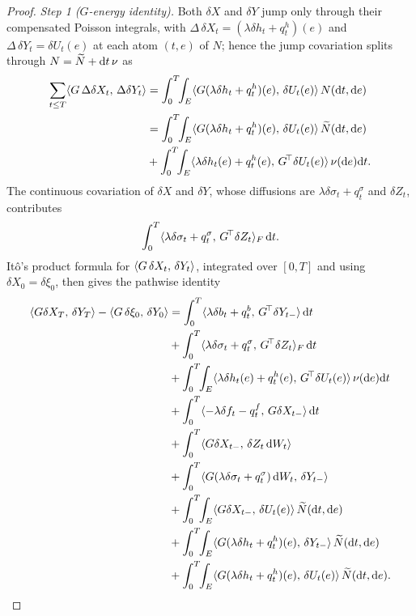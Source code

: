 \begin{proof}
\emph{Step 1 ($G$-energy identity).} Both $\delta X$ and $\delta Y$ jump only through
their compensated Poisson integrals, with $\Delta\,\delta X_t=(\lambda\delta h_t+q^h_t)(e)$
and $\Delta\,\delta Y_t=\delta U_t(e)$ at each atom $(t,e)$ of $N$; hence the jump
covariation splits through $N=\widetilde{N}+\mathrm{d} t\,\nu$ as
\[
\begin{aligned}
\sum_{t\le T}\langle G\,\Delta\delta X_t,\,\Delta\delta Y_t\rangle
&=\int_0^T\!\!\int_E\langle G(\lambda\delta h_t+q^h_t)(e),\,\delta U_t(e)\rangle\,N(\mathrm{d} t,\mathrm{d} e)\\
&=\int_0^T\!\!\int_E\langle G(\lambda\delta h_t+q^h_t)(e),\,\delta U_t(e)\rangle\,\widetilde{N}(\mathrm{d} t,\mathrm{d} e)\\
&+\int_0^T\!\!\int_E\langle \lambda\delta h_t(e)+q^h_t(e),\,G^{\!\top}\delta U_t(e)\rangle\,\nu(\mathrm{d} e)\mathrm{d} t .
\end{aligned}
\]
The continuous covariation of $\delta X$ and $\delta Y$, whose diffusions are
$\lambda\delta\sigma_t+q^\sigma_t$ and $\delta Z_t$, contributes
\[
\int_0^T\langle \lambda\delta\sigma_t+q^\sigma_t,\,G^{\!\top}\delta Z_t\rangle_F\,\mathrm{d} t .
\]
It\^o's product formula for $\langle G\,\delta X_t,\,\delta Y_t\rangle$, integrated over $[0,T]$ and using
$\delta X_0=\delta\xi_0$, then gives the pathwise identity
\begin{equation}\label{eq:Gid-path}
\begin{aligned}
\inner{G\delta X_T}{\delta Y_T}-\inner{G\,\delta\xi_0}{\delta Y_0}
&=\int_0^T\inner{\lambda\delta b_t+q^b_t}{\Gstar\delta Y_{t-}}\,\diff t\\
&+\int_0^T\inner{\lambda\delta\sigma_t+q^\sigma_t}{\Gstar\delta Z_t}_F\,\diff t\\
&+\int_0^T\!\!\int_E\inner{\lambda\delta h_t(e)+q^h_t(e)}{\Gstar\delta U_t(e)}\,\nu(\diff e)\diff t\\
&+\int_0^T\inner{-\lambda\delta f_t-q^f_t}{G\delta X_{t-}}\,\diff t\\
&+\int_0^T\inner{G\delta X_{t-}}{\delta Z_t\,\diff W_t}\\
&+\int_0^T\inner{G(\lambda\delta\sigma_t+q^\sigma_t)\,\diff W_t}{\delta Y_{t-}}\\
&+\int_0^T\!\!\int_E\inner{G\delta X_{t-}}{\delta U_t(e)}\,\Nt(\diff t,\diff e)\\
&+\int_0^T\!\!\int_E\inner{G(\lambda\delta h_t+q^h_t)(e)}{\delta Y_{t-}}\,\Nt(\diff t,\diff e)\\
&+\int_0^T\!\!\int_E\inner{G(\lambda\delta h_t+q^h_t)(e)}{\delta U_t(e)}\,\Nt(\diff t,\diff e) .
\end{aligned}
\end{equation}

\end{proof}
